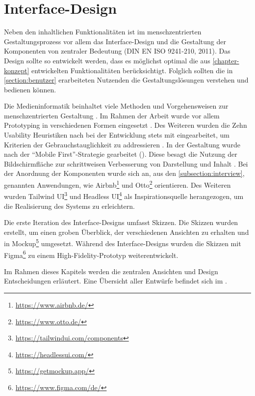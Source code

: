 \chapter{Interface-Design}
\label{chapter-design}
Neben den inhaltlichen Funktionalitäten ist im menschzentrierten Gestaltungsprozess vor allem das
Interface-Design und die Gestaltung der Komponenten von zentraler Bedeutung
\cite{din_en_iso_9421-2102020-03_din_nodate} (DIN EN ISO 9241-210, 2011). Das Design sollte so
entwickelt werden, dass es möglichst optimal die aus \ref{chapter-konzept} entwickelten
Funktionalitäten berücksichtigt. Folglich sollten die in \ref{section:benutzer} erarbeiteten
Nutzenden die Gestaltungslösungen verstehen und bedienen können.

Die Medieninformatik beinhaltet viele Methoden und Vorgehensweisen zur menschzentrierten Gestaltung
. Im Rahmen der Arbeit wurde vor allem Prototyping in verschiedenen Formen
eingesetzt . Des Weiteren wurden die Zehn Usability Heuristiken nach
 bei der Entwicklung stets mit eingearbeitet, um Kriterien der
Gebrauchstauglichkeit zu addressieren . In
der Gestaltung wurde nach der \enquote{Mobile First}-Strategie gearbeitet (). Diese
besagt die Nutzung der Bildschirmfläche zur schrittweisen Verbesserung von Darstellung und Inhalt
\cite{kim_chapter_2013}. Bei der Anordnung der Komponenten wurde sich an, aus den \ref{subsection:interview}, genannten
Anwendungen, wie Airbnb\footnote{\url{https://www.airbnb.de/}} und
Otto\footnote{\url{https://www.otto.de/}} orientieren. Des Weiteren wurden Tailwind
UI\footnote{\url{https://tailwindui.com/components}} und Headless
UI\footnote{\url{https://headlessui.com/}} als Inspirationsquelle herangezogen, um die Realisierung
des Systems zu erleichtern. 

Die erste Iteration des Interface-Designs umfasst Skizzen. Die Skizzen wurden erstellt, um einen
groben Überblick, der verschiedenen Ansichten zu erhalten und in
Mockup\footnote{\url{https://getmockup.app/}} umgesetzt. Während des Interface-Designs wurden die
Skizzen mit Figma\footnote{\url{https://www.figma.com/de/}} zu einem High-Fidelity-Prototyp
weiterentwickelt.

Im Rahmen dieses Kapitels werden die zentralen Ansichten und Design Entscheidungen erläutert. Eine
Übersicht aller Entwürfe befindet sich im .

